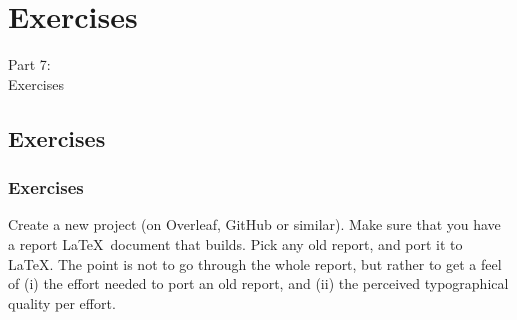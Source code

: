 {
\renewcommand{\bgcolor}{exercises}

\section{Exercises}
\begin{frame}
  \vspace{25mm}
  \begin{center}
    \Huge{Part 7:\\Exercises}
  \end{center}
\end{frame}

\subsection{Exercises}
\begin{frame}[fragile]
  \frametitle{Exercises}
  \vspace{3mm}
  \begin{enumerate}
     Create a new project (on Overleaf, GitHub or similar). Make sure that you have a report \LaTeX\ document that builds.
     Pick any old report, and port it to \LaTeX. The point is not to go through the whole report, but rather to get a feel of (i) the effort needed to port an old report, and (ii) the perceived typographical quality per effort.
  \end{enumerate}
\end{frame}

}

